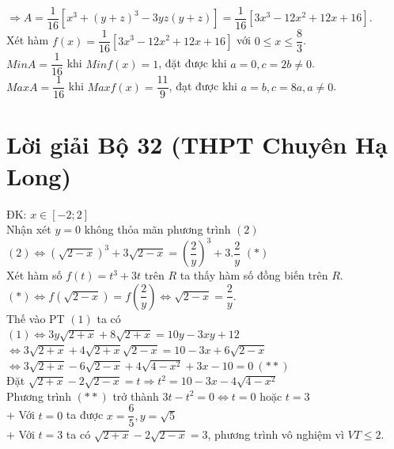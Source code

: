 $\Rightarrow A=\dfrac{1}{16}\left [ x^3+(y+z)^3-3yz(y+z) \right ]=\dfrac{1}{16}\left [ 3x^3-12x^2+12x+16 \right ]$.\\

Xét hàm $f(x)=\dfrac{1}{16}\left [ 3x^3-12x^2+12x+16 \right ]$ với $0\le x\le \dfrac{8}{3}$.\\

$MinA=\dfrac{1}{16}$ khi $Minf(x)=1$, đặt được khi $a=0,c=2b\neq 0$.\\
$MaxA=\dfrac{1}{16}$ khi $Maxf(x)=\dfrac{11}{9}$, đạt được khi $a=b,c=8a,a\neq 0$.

\section{Lời giải Bộ 32 (THPT Chuyên Hạ Long)}

\lgi
\vspace{5cm}

\lgi
ĐK: $x\in [-2;2]$\\
Nhận xét $y=0$ không thỏa mãn phương trình $(2)$\\
$(2)\iff \left ( \sqrt{2-x}\right )^3+3\sqrt{2-x}=\left(\dfrac{2}{y}\right)^3+3.\dfrac{2}{y}$ $(*)$\\
Xét hàm số $f(t)=t^3+3t$ trên $R$ ta thấy hàm số đồng biến trên $R$.\\
$(*)\iff f\left(\sqrt{2-x}\right)=f\left(\dfrac{2}{y}\right)\iff \sqrt{2-x}=\dfrac{2}{y}$.\\
Thế vào PT $(1)$ ta có\\
$(1)\iff 3y\sqrt{2+x}+8\sqrt{2+x}=10y-3xy+12$\\
$\iff 3\sqrt{2+x}+4\sqrt{2+x}\sqrt{2-x}=10-3x+6\sqrt{2-x}$\\
$\iff 3\sqrt{2+x}-6\sqrt{2-x}+4\sqrt{4-x^2}+3x-10=0~(**)$\\

Đặt $\sqrt{2+x}-2\sqrt{2-x}=t\Rightarrow t^2=10-3x-4\sqrt{4-x^2}$\\
Phương trình $(**)$ trở thành $3t-t^2=0\iff t=0$ hoặc $t=3$\\
+ Với $t=0$ ta được $x=\dfrac{6}{5},y=\sqrt{5}$\\
+ Với $t=3$ ta có $\sqrt{2+x}-2\sqrt{2-x}=3$, phương trình vô nghiệm vì $VT\le 2$.

